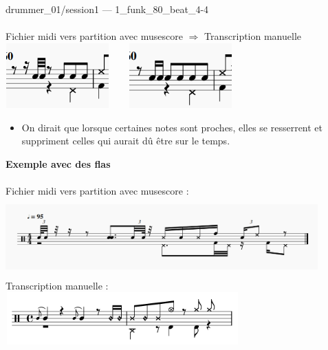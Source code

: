 drummer\_01/session1 — 1\_funk\_80\_beat\_4-4\\\\
Fichier midi vers partition avec musescore $\Rightarrow$ Transcription manuelle\\
\includegraphics[height=25mm, width=40mm]{z_images/transcriptions_manuelles/0_prise_en_main/1_drummer_01__session1/musescore_0.png}\ \ \ \ 
\includegraphics[height=25mm, width=40mm]{z_images/transcriptions_manuelles/0_prise_en_main/1_drummer_01__session1/Manuelle_0.png}
\begin{itemize}
	\item On dirait que lorsque certaines notes sont proches, elles se resserrent et suppriment celles qui aurait dû être sur le temps.\\
\end{itemize}
\textbf{Exemple avec des flas}\\\\
Fichier midi vers partition avec musescore :\\
\includegraphics[height=30mm, width=120mm]{z_images/transcriptions_manuelles/1_transcriptions_flas/124_funk_95_fill_4-4_0.png}\\
Transcription manuelle :\\
\includegraphics[height=20mm, width=90mm]{z_images/transcriptions_manuelles/1_transcriptions_flas/124_funk_95_fill_4-4_1_.png}\\
